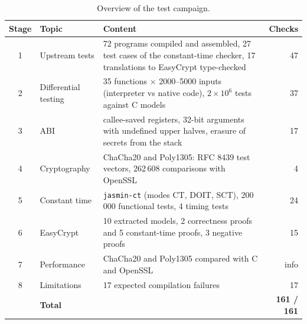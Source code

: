 \documentclass[11pt,a4paper]{article}
\begin{document}
\begin{table}[h]
\centering\small
\begin{tabularx}{\textwidth}{@{}clXr@{}}
\toprule
\textbf{Stage} & \textbf{Topic} & \textbf{Content} & \textbf{Checks} \\
\midrule
1 & Upstream tests & 72 programs compiled and assembled, 27 test cases of the constant-time checker, 17 translations to EasyCrypt type-checked & 47 \\
2 & Differential testing & 35 functions $\times$ 2000--5000 inputs (interpreter vs native code), $2\times10^6$ tests against C models & 37 \\
3 & ABI & callee-saved registers, 32-bit arguments with undefined upper halves, erasure of secrets from the stack & 17 \\
4 & Cryptography & ChaCha20 and Poly1305: RFC 8439 test vectors, 262\,608 comparisons with OpenSSL & 4 \\
5 & Constant time & \texttt{jasmin-ct} (modes CT, DOIT, SCT), 200\,000 functional tests, 4 timing tests & 24 \\
6 & EasyCrypt & 10 extracted models, 2 correctness proofs and 5 constant-time proofs, 3 negative proofs & 15 \\
7 & Performance & ChaCha20 and Poly1305 compared with C and OpenSSL & info \\
8 & Limitations & 17 expected compilation failures & 17 \\
\midrule
  & \textbf{Total} & & \textbf{161 / 161} \\
\bottomrule
\end{tabularx}
\caption{Overview of the test campaign.}
\label{tab:summary}
\end{table}
\end{document}
